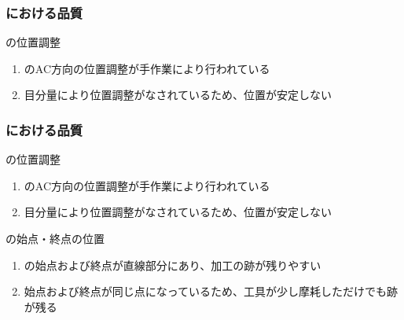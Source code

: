 \subsubsection{\EndFaceOutCChamferMilling における品質}

\begin{Issues}{\EndFaceOutCChamferMilling の位置調整}
\begin{enumerate}[label=\sarrow]
\item[{\sarrow[red]}]\EndFaceOutCChamferMilling のAC方向の位置調整が手作業により行われている
\item[{\sarrow[red]}]目分量により位置調整がなされているため、位置が安定しない
\end{enumerate}
\end{Issues}

\subsubsection{\EndFaceInCChamferMilling における品質}

\begin{Issues}{\EndFaceInCChamferMilling の位置調整}
\begin{enumerate}[label=\sarrow]
\item[{\sarrow[red]}]\EndFaceInCChamferMilling のAC方向の位置調整が手作業により行われている
\item[{\sarrow[red]}]目分量により位置調整がなされているため、位置が安定しない
\end{enumerate}
\end{Issues}

\begin{Issues}{\EndFaceInCChamferMilling の始点・終点の位置}
\begin{enumerate}[label=\sarrow]
\item[{\sarrow[red]}]\EndFaceInCChamferMilling の始点および終点が直線部分にあり、加工の跡が残りやすい
\item[{\sarrow[red]}]始点および終点が同じ点になっているため、工具が少し摩耗しただけでも跡が残る
\end{enumerate}
\end{Issues}

